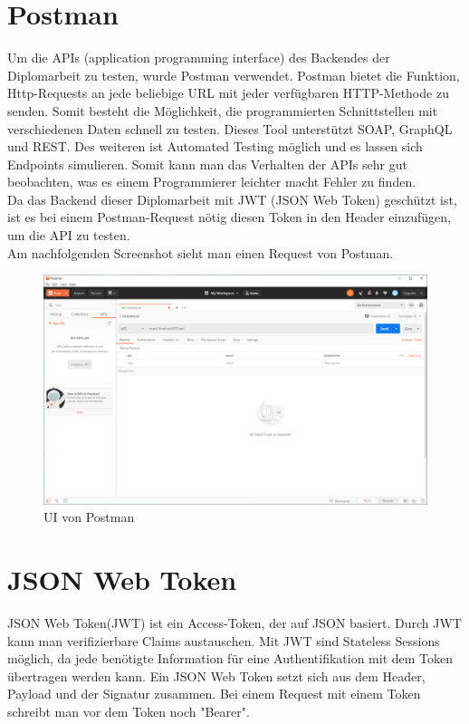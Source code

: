 \section{Postman}
Um die APIs (application programming interface) des Backendes der Diplomarbeit zu testen, wurde Postman verwendet. Postman bietet die Funktion, Http-Requests an jede beliebige URL mit jeder verfügbaren HTTP-Methode zu senden. Somit besteht die Möglichkeit, die programmierten Schnittstellen mit verschiedenen Daten schnell zu testen. Dieses Tool unterstützt SOAP, GraphQL und REST. Des weiteren ist Automated Testing möglich und es lassen sich Endpoints simulieren. Somit kann man das Verhalten der APIs sehr gut beobachten, was es einem Programmierer leichter macht Fehler zu finden. \autocite{postmanDocs} \\
Da das Backend dieser Diplomarbeit mit JWT (JSON Web Token) geschützt ist, ist es bei einem Postman-Request nötig diesen Token in den Header einzufügen, um die API zu testen.  \\
Am nachfolgenden Screenshot sieht man einen Request von Postman.
\begin{figure}[H]
	\centerline{
		\includegraphics[width=1\textwidth, frame]{./grafiken/postman.png}
	}
	\vskip0pt
	\caption{UI von Postman} \label{fig:postman}
\end{figure}


\section{JSON Web Token}
JSON Web Token(JWT) ist ein Access-Token, der auf JSON basiert. Durch JWT kann man verifizierbare Claims austauschen. Mit JWT sind Stateless Sessions möglich, da jede benötigte Information für eine Authentifikation mit dem Token übertragen werden kann. Ein JSON Web Token setzt sich aus dem Header, Payload und der Signatur zusammen. Bei einem Request mit einem Token schreibt man vor dem Token noch "Bearer". \autocite{wikiJWT}


